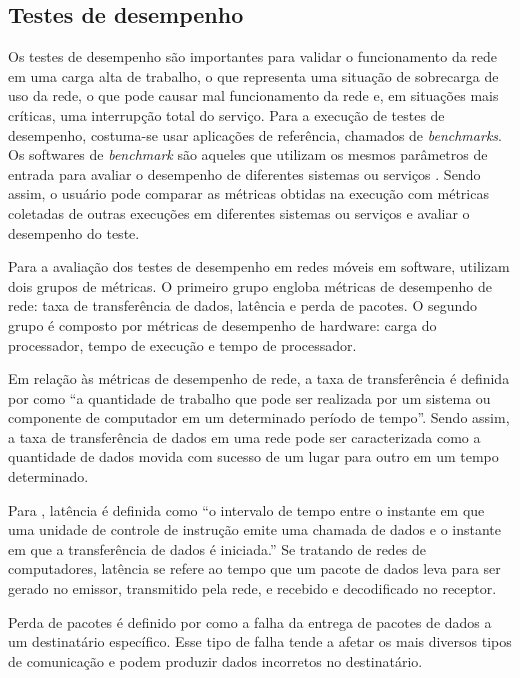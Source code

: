 \subsection{Testes de desempenho}

Os testes de desempenho são importantes para validar o funcionamento da rede em uma carga alta de trabalho, o que representa uma situação de sobrecarga de uso da rede, o que pode causar mal funcionamento da rede e, em situações mais críticas, uma interrupção total do serviço.
Para a execução de testes de desempenho, costuma-se usar aplicações de referência, chamados de \textit{benchmarks}.
Os softwares de \textit{benchmark} são aqueles que utilizam os mesmos parâmetros de entrada para avaliar o desempenho de diferentes sistemas ou serviços \cite{Boano2018}.
Sendo assim, o usuário pode comparar as métricas obtidas na execução com métricas coletadas de outras execuções em diferentes sistemas ou serviços e avaliar o desempenho do teste.

Para a avaliação dos testes de desempenho em redes móveis em software,  utilizam dois grupos de métricas.
O primeiro grupo engloba métricas de desempenho de rede: taxa de transferência de dados, latência e perda de pacotes.
O segundo grupo é composto por métricas de desempenho de hardware: carga do processador, tempo de execução e tempo de processador.

Em relação às métricas de desempenho de rede, a taxa de transferência é definida por  como ``a quantidade de trabalho que pode ser realizada por um sistema ou componente de computador em um determinado período de tempo''.
Sendo assim, a taxa de transferência de dados em uma rede pode ser caracterizada como a quantidade de dados movida com sucesso de um lugar para outro em um tempo determinado.

Para , latência é definida como ``o intervalo de tempo entre o instante em que uma unidade de controle de instrução emite uma chamada de dados e o instante em que a transferência de dados é iniciada.'' Se tratando de redes de computadores, latência se refere ao tempo que um pacote de dados leva para ser gerado no emissor, transmitido pela rede, e recebido e decodificado no receptor.

Perda de pacotes é definido por  como a falha da entrega de pacotes de dados a um destinatário específico. Esse tipo de falha tende a afetar os mais diversos tipos de comunicação e podem produzir dados incorretos no destinatário.

